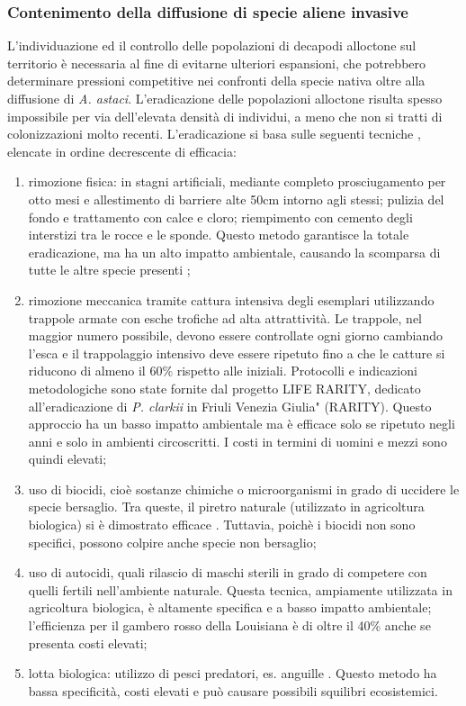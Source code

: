 \documentclass[11pt,a4paper,italian,twoside,openany]{memoir}
\begin{document}
\subsubsection{Contenimento della diffusione di specie aliene invasive} 
\label{subsub_conten}
L'individuazione ed il controllo delle popolazioni di decapodi alloctone sul territorio è necessaria al fine di evitarne ulteriori espansioni, che potrebbero determinare pressioni competitive nei confronti della specie nativa oltre alla diffusione di \emph{A. astaci}. L'eradicazione delle popolazioni alloctone risulta spesso impossibile per via dell'elevata densità di individui, a meno che non si tratti di colonizzazioni molto recenti. L'eradicazione si basa sulle seguenti tecniche \cite{Girardet 2012} \cite{AA.VV. 2014}, elencate in ordine decrescente di efficacia:
\begin{enumerate}[label={\arabic*)}]
  \item rimozione fisica: in stagni artificiali, mediante completo prosciugamento per otto mesi e allestimento di barriere alte 50cm intorno agli stessi; pulizia del fondo e trattamento con calce e cloro; riempimento con cemento degli interstizi tra le rocce e le sponde. Questo metodo garantisce la totale eradicazione, ma ha un alto impatto ambientale, causando la scomparsa di tutte le altre specie presenti \cite{Girardet 2012};
  \item rimozione meccanica tramite cattura intensiva degli esemplari utilizzando trappole armate con esche trofiche ad alta attrattività. Le trappole, nel maggior numero possibile, devono essere controllate ogni giorno cambiando l'esca e il trappolaggio intensivo deve essere ripetuto fino a che le catture si riducono di almeno il 60\% rispetto alle iniziali. Protocolli e indicazioni metodologiche sono state fornite dal progetto LIFE RARITY, dedicato all'eradicazione di \emph{P. clarkii} in Friuli Venezia Giulia" (RARITY). Questo approccio ha un basso impatto ambientale ma è efficace solo se ripetuto negli anni e solo in ambienti circoscritti. I costi in termini di uomini e mezzi sono quindi elevati;
  \item uso di biocidi, cioè sostanze chimiche o microorganismi in grado di uccidere le specie bersaglio. Tra queste, il piretro naturale (utilizzato in agricoltura biologica) si è dimostrato efficace \cite{Cecchinelli 2012}. Tuttavia, poichè i biocidi non sono specifici, possono colpire anche specie non bersaglio;
  \item uso di autocidi, quali rilascio di maschi sterili in grado di competere con quelli fertili nell'ambiente naturale. Questa tecnica, ampiamente utilizzata in agricoltura biologica, è altamente specifica e a basso impatto ambientale; l'efficienza per il gambero rosso della Louisiana è di oltre il 40\% \cite{Aquiloni 2009} anche se presenta costi elevati;
  \item lotta biologica: utilizzo di pesci predatori, es. anguille \cite{Aquiloni 2010b}. Questo metodo ha bassa specificità, costi elevati e può causare possibili squilibri ecosistemici.
\end{enumerate}
\end{document}
